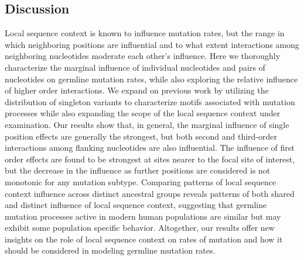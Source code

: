 \subsection{Discussion}

Local sequence context is known to influence mutation rates, but the range in which neighboring positions are influential and to what extent interactions among neighboring nucleotides moderate each other’s influence. Here we thoroughly characterize the marginal influence of individual nucleotides and pairs of nucleotides on germline mutation rates, while also exploring the relative influence of higher order interactions. We expand on previous work by utilizing the distribution of singleton variants to characterize motifs associated with mutation processes while also expanding the scope of the local sequence context under examination. Our results show that, in general, the marginal influence of single position effects are generally the strongest, but both second and third-order interactions among flanking nucleotides are also influential. The influence of first order effects are found to be strongest at sites nearer to the focal site of interest, but the decrease in the influence as further positions are considered is not monotonic for any mutation subtype.  Comparing patterns of local sequence context influence across distinct ancestral groups reveals patterns of both shared and distinct influence of local sequence context, suggesting that germline mutation processes active in modern human populations are similar but may exhibit some population specific behavior. Altogether, our results offer new insights on the role of local sequence context on rates of mutation and how it should be considered in modeling germline mutation rates.

